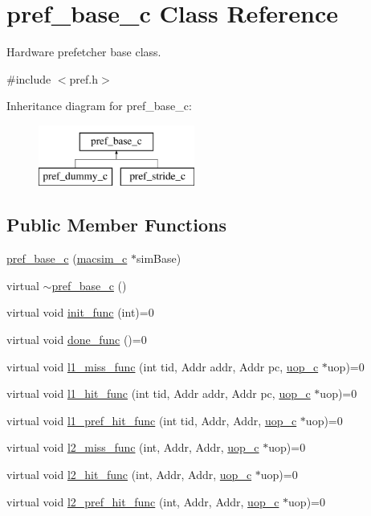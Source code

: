 \hypertarget{classpref__base__c}{
\section{pref\_\-base\_\-c Class Reference}
\label{classpref__base__c}
}


Hardware prefetcher base class.  




{\ttfamily \#include $<$pref.h$>$}

Inheritance diagram for pref\_\-base\_\-c:\begin{figure}[H]
\begin{center}
\leavevmode
\includegraphics[height=2.000000cm]{classpref__base__c}
\end{center}
\end{figure}
\subsection*{Public Member Functions}
\begin{DoxyCompactItemize}
\item 
\hyperlink{classpref__base__c_a0b524a96fc04c9a07e2a11c7ebaf18e2}{pref\_\-base\_\-c} (\hyperlink{classmacsim__c}{macsim\_\-c} $\ast$simBase)
\item 
virtual \hyperlink{classpref__base__c_a4166198ff942f6a3e2af3b66ee16e5ff}{$\sim$pref\_\-base\_\-c} ()
\item 
virtual void \hyperlink{classpref__base__c_a404371f4c7e814352f3a6e0a1aeb4a9b}{init\_\-func} (int)=0
\item 
virtual void \hyperlink{classpref__base__c_af6f4f755ba7bc869f5bae908969eb969}{done\_\-func} ()=0
\item 
virtual void \hyperlink{classpref__base__c_a2b23d47a615b8bb700bd79104bcc1855}{l1\_\-miss\_\-func} (int tid, Addr addr, Addr pc, \hyperlink{classuop__c}{uop\_\-c} $\ast$uop)=0
\item 
virtual void \hyperlink{classpref__base__c_a39c3f0b35e3346133be50dbef1b5aa13}{l1\_\-hit\_\-func} (int tid, Addr addr, Addr pc, \hyperlink{classuop__c}{uop\_\-c} $\ast$uop)=0
\item 
virtual void \hyperlink{classpref__base__c_a0d54d273c63a4c78873632b6ae1953a7}{l1\_\-pref\_\-hit\_\-func} (int tid, Addr, Addr, \hyperlink{classuop__c}{uop\_\-c} $\ast$uop)=0
\item 
virtual void \hyperlink{classpref__base__c_afe9bb0f31178fc9acf2d35afe65d6cd0}{l2\_\-miss\_\-func} (int, Addr, Addr, \hyperlink{classuop__c}{uop\_\-c} $\ast$uop)=0
\item 
virtual void \hyperlink{classpref__base__c_acba9e1586edcddff8983b46c2147e80d}{l2\_\-hit\_\-func} (int, Addr, Addr, \hyperlink{classuop__c}{uop\_\-c} $\ast$uop)=0
\item 
virtual void \hyperlink{classpref__base__c_ae89bc30a1f74a1199bec721ca78197c1}{l2\_\-pref\_\-hit\_\-func} (int, Addr, Addr, \hyperlink{classuop__c}{uop\_\-c} $\ast$uop)=0
\end{DoxyCompactItemize}
